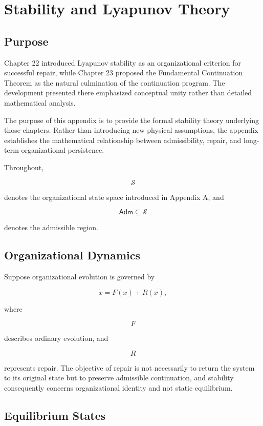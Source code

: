 \documentclass[11pt,oneside]{book}
\numberwithin{equation}{chapter}
\theoremstyle{definition}
\theoremstyle{plain}
\newcommand{\Adm}{\mathsf{Adm}}
\begin{document}
\chapter{Stability and Lyapunov Theory}

\section{Purpose}

Chapter 22 introduced Lyapunov stability as an organizational criterion for
successful repair, while Chapter 23 proposed the Fundamental Continuation
Theorem as the natural culmination of the continuation program. The
development presented there emphasized conceptual unity rather than
detailed mathematical analysis.

The purpose of this appendix is to provide the formal stability theory
underlying those chapters. Rather than introducing new physical
assumptions, the appendix establishes the mathematical relationship
between admissibility, repair, and long-term organizational persistence.

Throughout,

\[
\mathcal S
\]

denotes the organizational state space introduced in Appendix A, and

\[
\Adm
\subseteq
\mathcal S
\]

denotes the admissible region.

\section{Organizational Dynamics}

Suppose organizational evolution is governed by

\[
\dot{x}
=
F(x)
+
R(x),
\]

where

\[
F
\]

describes ordinary evolution, and

\[
R
\]

represents repair. The objective of repair is not necessarily to return the system to its original state but to preserve admissible continuation, and stability consequently concerns organizational identity and not static equilibrium.

\section{Equilibrium States}
\end{document}
